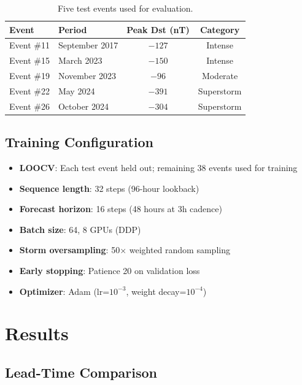 \documentclass[11pt,a4paper]{article}
\begin{document}
\begin{table}[H]
\centering
\caption{Five test events used for evaluation.}
\label{tab:events}
\begin{tabular}{llcc}
\toprule
\textbf{Event} & \textbf{Period} & \textbf{Peak Dst (nT)} & \textbf{Category} \\
\midrule
Event \#11 & September 2017 & $-127$ & Intense \\
Event \#15 & March 2023 & $-150$ & Intense \\
Event \#19 & November 2023 & $-96$ & Moderate \\
Event \#22 & May 2024 & $-391$ & Superstorm \\
Event \#26 & October 2024 & $-304$ & Superstorm \\
\bottomrule
\end{tabular}
\end{table}

\subsection{Training Configuration}

\begin{itemize}[nosep]
    \item \textbf{LOOCV}: Each test event held out; remaining 38 events used for training
    \item \textbf{Sequence length}: 32 steps (96-hour lookback)
    \item \textbf{Forecast horizon}: 16 steps (48 hours at 3h cadence)
    \item \textbf{Batch size}: 64, 8 GPUs (DDP)
    \item \textbf{Storm oversampling}: 50$\times$ weighted random sampling
    \item \textbf{Early stopping}: Patience 20 on validation loss
    \item \textbf{Optimizer}: Adam (lr=$10^{-3}$, weight decay=$10^{-4}$)
\end{itemize}

\section{Results}

\subsection{Lead-Time Comparison}
\end{document}
